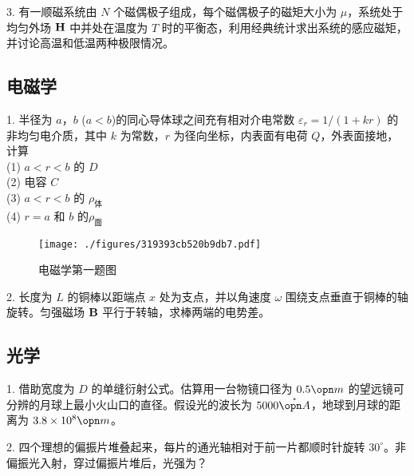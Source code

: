 3. 有一顺磁系统由 $N$ 个磁偶极子组成，每个磁偶极子的磁矩大小为 $\mu$，系统处于均匀外场 $\bf H$ 中并处在温度为 $T$ 时的平衡态，利用经典统计求出系统的感应磁矩，并讨论高温和低温两种极限情况。
\subsection{电磁学}
1. 半径为 $a$，$b$ ($a<b$)的同心导体球之间充有相对介电常数 $\varepsilon_r=1/(1+kr)$ 的非均匀电介质，其中 $k$ 为常数，$r$ 为径向坐标，内表面有电荷 $Q$，外表面接地，计算\\
(1) $ a<r<b $ 的 $D$\\
(2) 电容 $C$\\
(3) $ a<r<b $ 的 $\rho_{\text{体}}$\\
(4) $ r=a $ 和 $b$ 的$\rho_{\text{面}}$
\begin{figure}[ht]
\centering
\texttt{[image: ./figures/319393cb520b9db7.pdf]}
\caption{电磁学第一题图} \label{fig_NJU12_4}
\end{figure}
2. 长度为 $L$ 的铜棒以距端点 $x$ 处为支点，并以角速度 $\omega$ 围绕支点垂直于铜棒的轴旋转。匀强磁场 $\bf B$ 平行于转轴，求棒两端的电势差。
\subsection{光学}
1. 借助宽度为 $D$ 的单缝衍射公式。估算用一台物镜口径为 $0.5 \opn m$ 的望远镜可分辨的月球上最小火山口的直径。假设光的波长为 $5000\mathring{\opn A}$，地球到月球的距离为 $3.8\times 10^8 \opn m$。

2. 四个理想的偏振片堆叠起来，每片的通光轴相对于前一片都顺时针旋转 $30^\circ$。非偏振光入射，穿过偏振片堆后，光强为？
